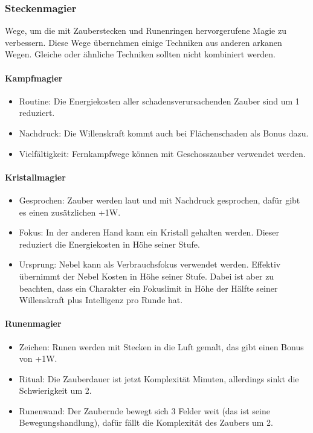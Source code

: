 \documentclass{article}
\begin{document}
\subsubsection{Steckenmagier}

Wege, um die mit Zauberstecken und Runenringen hervorgerufene Magie zu verbessern. Diese Wege übernehmen einige
Techniken aus anderen arkanen Wegen. Gleiche oder ähnliche Techniken sollten nicht kombiniert werden.

\paragraph{Kampfmagier}

\begin{itemize}
\item Routine: Die Energiekosten aller schadensverursachenden Zauber sind um 1 reduziert.
\item Nachdruck: Die Willenskraft kommt auch bei Flächenschaden als Bonus dazu.
\item Vielfältigkeit: Fernkampfwege können mit Geschosszauber verwendet werden.
\end{itemize}

\paragraph{Kristallmagier}

\begin{itemize}
\item Gesprochen: Zauber werden laut und mit Nachdruck gesprochen, dafür gibt es einen zusätzlichen +1W.
\item Fokus: In der anderen Hand kann ein Kristall gehalten werden. Dieser reduziert die Energiekosten in Höhe seiner Stufe.
\item Ursprung: Nebel kann als Verbrauchsfokus verwendet werden. Effektiv übernimmt der Nebel Kosten in Höhe seiner Stufe. Dabei ist aber zu beachten, dass ein Charakter ein Fokuslimit in Höhe der Hälfte seiner Willenskraft plus Intelligenz pro Runde hat.
\end{itemize}

\paragraph{Runenmagier}

\begin{itemize}
\item Zeichen: Runen werden mit Stecken in die Luft gemalt, das gibt einen Bonus von +1W.
\item Ritual: Die Zauberdauer ist jetzt Komplexität Minuten, allerdings sinkt die Schwierigkeit um 2.
\item Runenwand: Der Zaubernde bewegt sich 3 Felder weit (das ist seine Bewegungshandlung), dafür fällt die Komplexität des Zaubers um 2.
\end{itemize}
\end{document}
